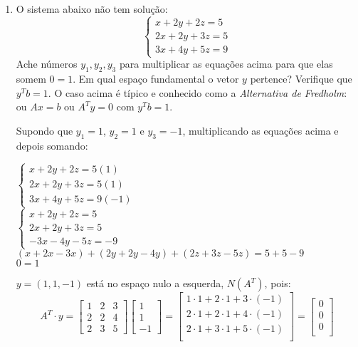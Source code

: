 \documentclass[leqno]{article}
\begin{document}
\begin{enumerate}
		\item O sistema abaixo não tem solução:
		$$\begin{cases}
			x + 2y + 2z = 5\\
			2x + 2y + 3z = 5\\
			3x + 4y + 5z = 9
		\end{cases}$$
		Ache números $y_1,y_2,y_3$ para multiplicar as equações acima para que elas somem $0=1$. Em qual espaço fundamental o vetor $y$ pertence? Verifique que $y^Tb = 1$. O caso acima é típico e conhecido como a \textit{Alternativa de Fredholm}: ou $Ax = b$ ou $A^Ty = 0$ com $y^Tb = 1$.
		
		\begin{sol} 
			Supondo que $y_1 = 1$, $y_2 = 1$ e $y_3 = -1$, multiplicando as equações acima e depois somando:
			
			$
			\left\{
			\begin {array}{cl}
			x + 2y + 2z = 5 (1)\\
			2x + 2y + 3z = 5 (1)\\
			3x + 4y + 5z = 9 (-1)
			\end{array}
			\right.
			$\\    
			
			$
			\left\{
			\begin {array}{cl}
			x + 2y + 2z = 5 \\
			2x + 2y + 3z = 5 \\
			-3x - 4y - 5z = -9 
			\end{array}
			\right.
			$\\   
			
			$(x + 2x - 3x) + (2y + 2y - 4y) + (2z + 3z - 5z) = 5 + 5 - 9$\\
			$0 = 1$
			
			$y = (1, 1, -1)$ está no espaço nulo a esquerda, $N(A^T)$, pois:
			$$A^T \cdot y = \begin{bmatrix}
				1 & 2 & 3 \\
				2 & 2 & 4 \\
				2 & 3 & 5
			\end{bmatrix}\begin{bmatrix}
			1 \\
			1 \\
			-1
			\end{bmatrix} = \begin{bmatrix}
			1 \cdot 1 + 2 \cdot 1 + 3 \cdot (-1) \\
			2 \cdot 1 + 2 \cdot 1 + 4 \cdot (-1)\\
			2 \cdot 1 + 3 \cdot 1 + 5 \cdot (-1)\\
			\end{bmatrix} = \begin{bmatrix}
			0 \\
			0\\
			0\\
			\end{bmatrix}$$
		

\end{sol}
\end{enumerate}
\end{document}
